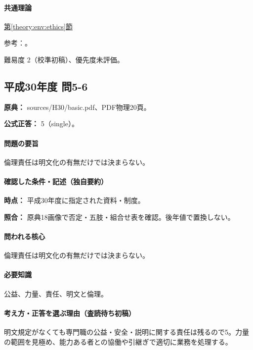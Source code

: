 \paragraph{共通理論} \hyperref[theory:env:ethics]{第\ref*{theory:env:ethics}節}

\par 参考：\cite{ipej_ethics2011}。

\par 難易度 2（校準初稿）、優先度未評価。

\subsection{平成30年度 問5-6}
\label{q:h30-reg-basic-5-6}

\noindent\textbf{原典：} sources/H30/basic.pdf、PDF物理20頁。

\textbf{公式正答：} 5（single）。

\paragraph{問題の要旨} 倫理責任は明文化の有無だけでは決まらない。

\paragraph{確認した条件・記述（独自要約）}\mbox{}\par

\noindent\textbf{時点：} 平成30年度に指定された資料・制度。\par

\noindent\textbf{照合：} 原典18画像で否定・五肢・組合せ表を確認。後年値で置換しない。\par

\paragraph{問われる核心} 倫理責任は明文化の有無だけでは決まらない。

\paragraph{必要知識} 公益、力量、責任、明文と倫理。

\paragraph{考え方・正答を選ぶ理由（査読待ち初稿）} 明文規定がなくても専門職の公益・安全・説明に関する責任は残るので5。力量の範囲を見極め、能力ある者との協働や引継ぎで適切に業務を処理する。

